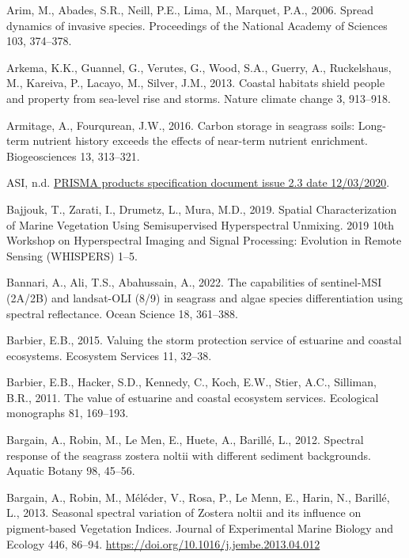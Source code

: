 \documentclass[
  letterpaper,
  11pt,
  english,
  singlespacing,
  headsepline]{MastersDoctoralThesis}
\newlength{\cslhangindent}
\newenvironment{CSLReferences}[2] %
 {\begin{list}{}{%
  \setlength{\itemindent}{0pt}
  \setlength{\leftmargin}{0pt}
  \setlength{\parsep}{0pt}
  \ifodd #1
   \setlength{\leftmargin}{\cslhangindent}
   \setlength{\itemindent}{-1\cslhangindent}
  \fi
  \setlength{\itemsep}{#2\baselineskip}}}
 {\end{list}}
\begin{document}
\begin{CSLReferences}{1}{0}
Arim, M., Abades, S.R., Neill, P.E., Lima, M., Marquet, P.A., 2006.
Spread dynamics of invasive species. Proceedings of the National Academy
of Sciences 103, 374--378.

Arkema, K.K., Guannel, G., Verutes, G., Wood, S.A., Guerry, A.,
Ruckelshaus, M., Kareiva, P., Lacayo, M., Silver, J.M., 2013. Coastal
habitats shield people and property from sea-level rise and storms.
Nature climate change 3, 913--918.

Armitage, A., Fourqurean, J.W., 2016. Carbon storage in seagrass soils:
Long-term nutrient history exceeds the effects of near-term nutrient
enrichment. Biogeosciences 13, 313--321.

ASI, n.d.
\href{http://prisma.asi.it/missionselect/docs/PRISMA\%20Product\%20Specifications_Is2_3.pdf}{PRISMA
products specification document issue 2.3 date 12/03/2020}.

Bajjouk, T., Zarati, I., Drumetz, L., Mura, M.D., 2019. {Spatial
Characterization of Marine Vegetation Using Semisupervised Hyperspectral
Unmixing}. 2019 10th Workshop on Hyperspectral Imaging and Signal
Processing: Evolution in Remote Sensing (WHISPERS) 1--5.

Bannari, A., Ali, T.S., Abahussain, A., 2022. The capabilities of
sentinel-MSI (2A/2B) and landsat-OLI (8/9) in seagrass and algae species
differentiation using spectral reflectance. Ocean Science 18, 361--388.

Barbier, E.B., 2015. Valuing the storm protection service of estuarine
and coastal ecosystems. Ecosystem Services 11, 32--38.

Barbier, E.B., Hacker, S.D., Kennedy, C., Koch, E.W., Stier, A.C.,
Silliman, B.R., 2011. The value of estuarine and coastal ecosystem
services. Ecological monographs 81, 169--193.

Bargain, A., Robin, M., Le Men, E., Huete, A., Barillé, L., 2012.
Spectral response of the seagrass zostera noltii with different sediment
backgrounds. Aquatic Botany 98, 45--56.

Bargain, A., Robin, M., Méléder, V., Rosa, P., Le Menn, E., Harin, N.,
Barillé, L., 2013. {Seasonal spectral variation of Zostera noltii and
its influence on pigment-based Vegetation Indices}. Journal of
Experimental Marine Biology and Ecology 446, 86--94.
\url{https://doi.org/10.1016/j.jembe.2013.04.012}


\end{CSLReferences}
\end{document}
